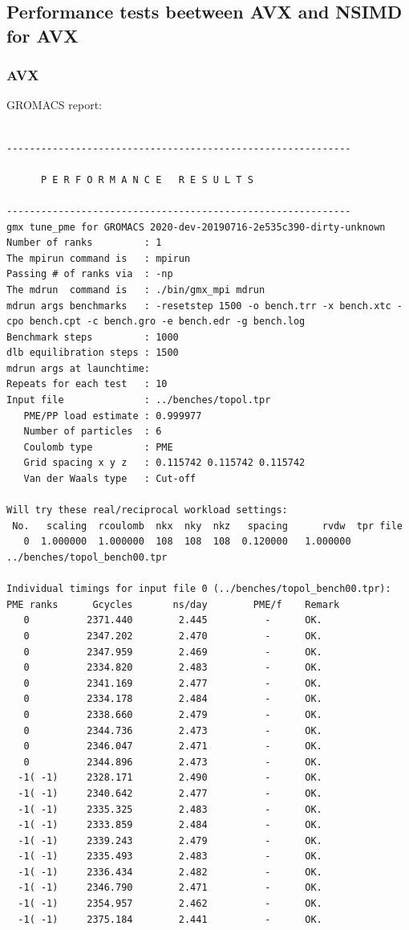 \subsection{Performance tests beetween AVX and NSIMD for AVX}
\subsubsection{AVX}
GROMACS report: \\
\begin{lstlisting}[frame=single]

------------------------------------------------------------

      P E R F O R M A N C E   R E S U L T S

------------------------------------------------------------
gmx tune_pme for GROMACS 2020-dev-20190716-2e535c390-dirty-unknown
Number of ranks         : 1
The mpirun command is   : mpirun
Passing # of ranks via  : -np
The mdrun  command is   : ./bin/gmx_mpi mdrun
mdrun args benchmarks   : -resetstep 1500 -o bench.trr -x bench.xtc -cpo bench.cpt -c bench.gro -e bench.edr -g bench.log 
Benchmark steps         : 1000
dlb equilibration steps : 1500
mdrun args at launchtime: 
Repeats for each test   : 10
Input file              : ../benches/topol.tpr
   PME/PP load estimate : 0.999977
   Number of particles  : 6
   Coulomb type         : PME
   Grid spacing x y z   : 0.115742 0.115742 0.115742
   Van der Waals type   : Cut-off

Will try these real/reciprocal workload settings:
 No.   scaling  rcoulomb  nkx  nky  nkz   spacing      rvdw  tpr file
   0  1.000000  1.000000  108  108  108  0.120000   1.000000  ../benches/topol_bench00.tpr

Individual timings for input file 0 (../benches/topol_bench00.tpr):
PME ranks      Gcycles       ns/day        PME/f    Remark
   0          2371.440        2.445          -      OK.
   0          2347.202        2.470          -      OK.
   0          2347.959        2.469          -      OK.
   0          2334.820        2.483          -      OK.
   0          2341.169        2.477          -      OK.
   0          2334.178        2.484          -      OK.
   0          2338.660        2.479          -      OK.
   0          2344.736        2.473          -      OK.
   0          2346.047        2.471          -      OK.
   0          2344.896        2.473          -      OK.
  -1( -1)     2328.171        2.490          -      OK.
  -1( -1)     2340.642        2.477          -      OK.
  -1( -1)     2335.325        2.483          -      OK.
  -1( -1)     2333.859        2.484          -      OK.
  -1( -1)     2339.243        2.479          -      OK.
  -1( -1)     2335.493        2.483          -      OK.
  -1( -1)     2336.434        2.482          -      OK.
  -1( -1)     2346.790        2.471          -      OK.
  -1( -1)     2354.957        2.462          -      OK.
  -1( -1)     2375.184        2.441          -      OK.


\end{lstlisting}
